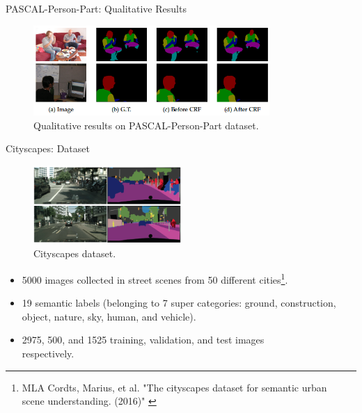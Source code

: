 \documentclass{beamer}
\begin{document}
\begin{frame}{PASCAL-Person-Part: Qualitative Results}	
\begin{figure}
	\centering
	\includegraphics[width=0.80\textwidth]{figure/ss35.png}
	\captionsetup{justification=centering}
	\caption{Qualitative results on PASCAL-Person-Part dataset.}
	\label{fig:M4}
\end{figure}
\end{frame}

\begin{frame}{Cityscapes: Dataset}	
\begin{figure}
	\centering
	\includegraphics[width=0.50\textwidth]{figure/ss38.png}
	\captionsetup{justification=centering}
	\caption{Cityscapes dataset.}
\end{figure}
\vspace{-0.5cm}
\begin{itemize}
	\item {\color{blue}5000} images collected in street scenes from {\color{blue}50} different cities\footnote{MLA	
		Cordts, Marius, et al. "The cityscapes dataset for semantic urban\\ scene understanding. (2016)" \label{label3}}.
	\item {\color{blue}19} semantic labels (belonging to {\color{blue}7 super categories}: ground, construction, object, nature, sky, human, and vehicle). 
	\item {\color{blue}2975}, {\color{blue}500}, and {\color{blue}1525} training, validation, and test images\\ respectively.
\end{itemize}
\end{frame}
\end{document}
